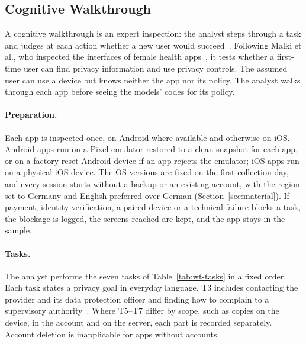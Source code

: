 \subsection{Cognitive Walkthrough}
\label{sec:walkthroughs}
A cognitive walkthrough is an expert inspection: the analyst steps through a task and judges at
each action whether a new user would succeed~\parencite{mahatody2010state,wharton1994cognitive}.
Following Malki et al., who inspected the interfaces of female health
apps~\parencite{malki2024exploring}, it tests whether a first-time user can find privacy
information and use privacy controls. The assumed user can use a device but knows neither the
app nor its policy. The analyst walks through each app before seeing the models' codes for its
policy.

\paragraph{Preparation.} Each app is inspected once, on Android where available and otherwise
on iOS. Android apps run on a Pixel emulator restored to a clean snapshot for each app, or on a
factory-reset Android device if an app rejects the emulator; iOS apps run on a physical iOS
device. The OS versions are fixed on the first collection day, and every session starts without
a backup or an existing account, with the region set to Germany and English preferred over
German (Section~\ref{sec:material}). If payment, identity verification, a paired device or a
technical failure blocks a task, the blockage is logged, the screens reached are kept, and the
app stays in the sample.

\paragraph{Tasks.} The analyst performs the seven tasks of Table~\ref{tab:wt-tasks} in a fixed
order. Each task states a privacy goal in everyday language. T3 includes contacting the provider
and its data protection officer and finding how to complain to a supervisory
authority~\parencite[Art.~13(1)(b), 13(2)(d), 77]{gdpr2016}. Where T5--T7 differ by scope, such
as copies on the device, in the account and on the server, each part is recorded separately.
Account deletion is inapplicable for apps without accounts.

